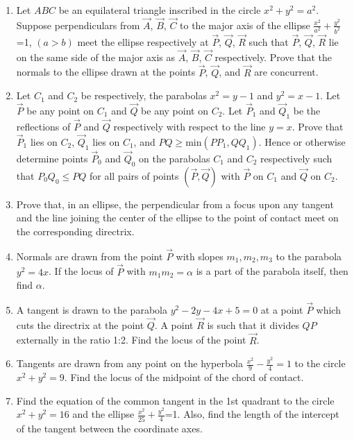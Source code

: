 \begin{enumerate}[label=\thesubsection.\arabic*.,ref=\thesubsection.\theenumi]
\item Let $ABC$ be an equilateral triangle inscribed in the circle $x^2+y^2=a^2$. Suppose perpendiculars from $\vec{A}$, $\vec{B}$, $\vec{C}$ to the major axis of the ellipse $\frac{x^2}{a^2}+\frac{y^2}{b^2}$=1, $(a>b)$ meet the ellipse respectively at $\vec{P}$, $\vec{Q}$, $\vec{R}$ such that $\vec{P}$, $\vec{Q}$, $\vec{R}$ lie on the same side of the major axis as $\vec{A}$, $\vec{B}$, $\vec{C}$ respectively. Prove that the normals to the ellipse drawn at the points $\vec{P}$, $\vec{Q}$, and $\vec{R}$ are concurrent. \hfill{}

\item Let $C_1$ and $C_2$ be respectively, the parabolas $x^2=y-1$ and $y^2=x-1$. Let $\vec{P}$ be any point on $C_1$ and $\vec{Q}$ be any point on $C_2$. Let $\vec{P}_1$ and $\vec{Q}_1$ be the reflections of $\vec{P}$ and $\vec{Q}$ respectively with respect to the line $y=x$. Prove that $\vec{P}_1$ lies on $C_2$, $\vec{Q}_1$ lies on $C_1$, and $PQ \geq \text{min}({PP_1, QQ_1})$. Hence or otherwise determine points $\vec{P}_0$ and $\vec{Q}_0$ on the parabolas $C_1$ and $C_2$ respectively such that $P_0Q_0 \leq PQ$ for all pairs of points $(\vec{P},\vec{Q})$ with $\vec{P}$ on $C_1$ and $\vec{Q}$ on $C_2$. \hfill{}
\item Prove that, in an ellipse, the perpendicular from a focus upon any tangent and the line joining the center of the ellipse to the point of contact meet on the corresponding directrix. \hfill{}

\item Normals are drawn from the point $\vec{P}$ with slopes $m_1, m_2, m_3$ to the parabola $y^2=4x$. If the locus of $\vec{P}$ with $m_1m_2=\alpha$ is a part of the parabola itself, then find $\alpha$. \hfill{}

\item A tangent is drawn to the parabola $y^2-2y-4x+5=0$ at a point $\vec{P}$ which cuts the directrix at the point $\vec{Q}$. A point $\vec{R}$ is such that it divides $QP$ externally in the ratio 1:2. Find the locus of the point $\vec{R}$. \hfill{}

\item Tangents are drawn from any point on the hyperbola $\frac{x^2}{9}-\frac{y^2}{4}=1$ to the circle $x^2+y^2=9$. Find the locus of the midpoint of the chord of contact. \hfill{}

\item Find the equation of the common tangent in the 1st quadrant to the circle $x^2+y^2=16$ and the ellipse $\frac{x^2}{25}+\frac{y^2}{4}$=1. Also, find the length of the intercept of the tangent between the coordinate axes. \hfill{} 


\end{enumerate}
